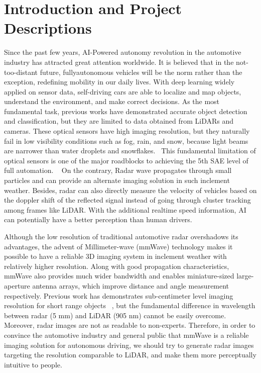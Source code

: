 \section{Introduction and Project Descriptions} \label{introduction}
Since the past few years, AI-Powered autonomy revolution in the automotive industry has attracted great attention worldwide. It is believed that in the not-too-distant future, fullyautonomous vehicles will be the norm rather than the exception, redefining mobility in our daily lives. With deep learning widely applied on sensor data, self-driving cars are able to localize and map objects, understand the environment, and make correct decisions. As the most fundamental task, previous works have demonstrated accurate object detection and classification, but they are limited to data obtained from LiDARs and cameras. These optical sensors have high imaging resolution, but they naturally fail in low visibility conditions such as fog, rain, and snow, because light beams are narrower than water droplets and snowflakes.~\cite{snow} This fundamental limitation of optical sensors is one of the major roadblocks to achieving the 5th SAE level of full automation. ~\cite{SAE} On the contrary, Radar wave propagates through small particles and can provide an alternate imaging solution in such inclement weather. Besides, radar can also directly measure the velocity of vehicles based on the doppler shift of the reflected signal instead of going through cluster tracking among frames like LiDAR. With the additional realtime speed information, AI can potentially have a better perception than human drivers.

Although the low resolution of traditional automotive radar overshadows its advantages, the advent of Millimeter-wave (mmWave) technology makes it possible to have a reliable 3D imaging system in inclement weather with relatively higher resolution. Along with good propagation characteristics, mmWave also provides much wider bandwidth and enables miniature-sized large-aperture antenna arrays, which improve distance and angle measurement respectively. Previous work has demonstrates sub-centimeter level imaging resolution for short range objects ~\cite{mmWave_SAR}, but the fundamental difference in wavelength between radar (5 mm) and LiDAR (905 nm) cannot be easily overcome. Moreover, radar images are not as readable to non-experts. Therefore, in order to convince the automotive industry and general public that mmWave is a reliable imaging solution for autonomous driving, we should try to generate radar images targeting the resolution comparable to LiDAR, and make them more perceptually intuitive to people. 


